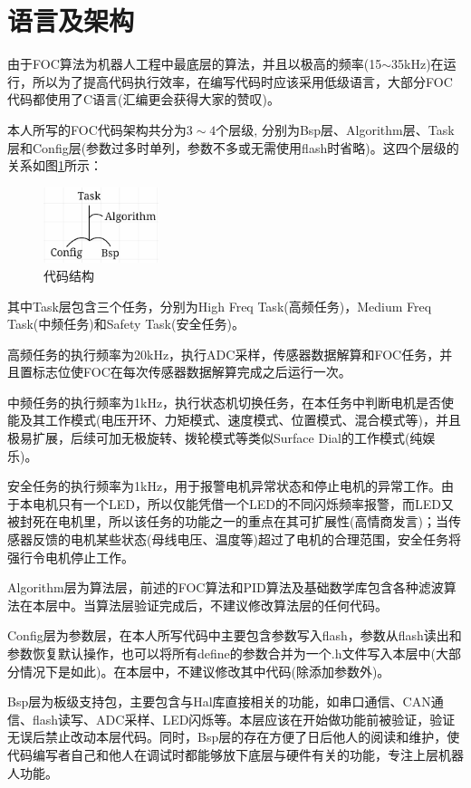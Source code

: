 \documentclass[main.tex]{subfiles}
\begin{document}
\section{语言及架构}
由于FOC算法为机器人工程中最底层的算法，并且以极高的频率(15$\sim$35kHz)在运行，所以为了提高代码执行效率，在编写代码时应该采用低级语言，大部分FOC代码都使用了C语言(汇编更会获得大家的赞叹)。

本人所写的FOC代码架构共分为$3\sim 4$个层级, 分别为Bsp层、Algorithm层、Task层和Config层(参数过多时单列，参数不多或无需使用flash时省略)。这四个层级的关系如图\ref{代码结构}所示：
\begin{figure}[H]
    \centering
    \includegraphics[width=0.3\textwidth]{img/img_1.1.3.png}
    \caption{代码结构}
    \label{代码结构}
\end{figure}

其中Task层包含三个任务，分别为High Freq Task(高频任务)，Medium Freq Task(中频任务)和Safety Task(安全任务)。

高频任务的执行频率为20kHz，执行ADC采样，传感器数据解算和FOC任务，并且置标志位使FOC在每次传感器数据解算完成之后运行一次。

中频任务的执行频率为1kHz，执行状态机切换任务，在本任务中判断电机是否使能及其工作模式(电压开环、力矩模式、速度模式、位置模式、混合模式等)，并且极易扩展，后续可加无极旋转、拨轮模式等类似Surface Dial的工作模式(纯娱乐)。

安全任务的执行频率为1kHz，用于报警电机异常状态和停止电机的异常工作。由于本电机只有一个LED，所以仅能凭借一个LED的不同闪烁频率报警，而LED又被封死在电机里，所以该任务的功能之一的重点在其可扩展性(高情商发言)；当传感器反馈的电机某些状态(母线电压、温度等)超过了电机的合理范围，安全任务将强行令电机停止工作。

Algorithm层为算法层，前述的FOC算法和PID算法及基础数学库包含各种滤波算法在本层中。当算法层验证完成后，不建议修改算法层的任何代码。

Config层为参数层，在本人所写代码中主要包含参数写入flash，参数从flash读出和参数恢复默认操作，也可以将所有define的参数合并为一个.h文件写入本层中(大部分情况下是如此)。在本层中，不建议修改其中代码(除添加参数外)。

Bsp层为板级支持包，主要包含与Hal库直接相关的功能，如串口通信、CAN通信、flash读写、ADC采样、LED闪烁等。本层应该在开始做功能前被验证，验证无误后禁止改动本层代码。同时，Bsp层的存在方便了日后他人的阅读和维护，使代码编写者自己和他人在调试时都能够放下底层与硬件有关的功能，专注上层机器人功能。
\end{document}
